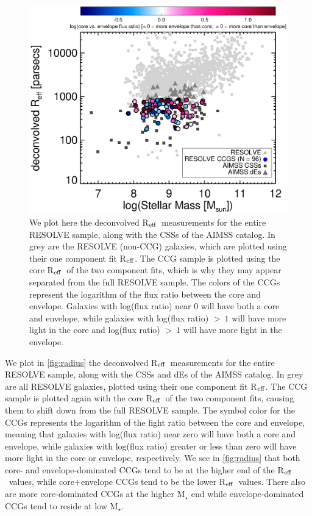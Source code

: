 \documentclass[iop,apj]{emulateapj}
\newcommand{\Reff}{R$_{\rm eff}$}
\begin{document}
\begin{figure}[hbpt!]
\begin{center}
\includegraphics{Reff_Mstars.eps}
\caption{We plot here the deconvolved \Reff\ measurements for the entire RESOLVE sample, along with the CSSs of the AIMSS catalog. In grey are the RESOLVE (non-CCG) galaxies, which are plotted using their one component fit \Reff. The CCG sample is plotted using the core \Reff\ of the two component fits, which is why they may appear separated from the full RESOLVE sample. The colors of the CCGs represent the logarithm of the flux ratio between the core and envelope. Galaxies with log(flux ratio) near 0 will have both a core and envelope, while galaxies with log(flux ratio) $>~1$ will have more light in the core and log(flux ratio) $>~1$ will have more light in the envelope.}
\label{fig:radius}
\end{center}
\end{figure}

We plot in \autoref{fig:radius} the deconvolved \Reff\ measurements for the entire RESOLVE sample, along with the CSSs and dEs of the AIMSS catalog. In grey are all RESOLVE galaxies, plotted using their one component fit \Reff. The CCG sample is plotted again with the core \Reff\ of the two component fits, causing them to shift down from the full RESOLVE sample. The symbol color for the CCGs represents the logarithm of the light ratio between the core and envelope, meaning that galaxies with log(flux ratio) near zero will have both a core and envelope, while galaxies with log(flux ratio) greater or less than zero will have more light in the core or envelope, respectively. We see in \autoref{fig:radius} that both core- and envelope-dominated CCGs tend to be at the higher end of the \Reff\ values, while core+envelope CCGs tend to be the lower \Reff\ values. There also are more core-dominated CCGs at the higher M$_{\star}$ end while envelope-dominated CCGs tend to reside at low M$_{\star}$.
\end{document}
